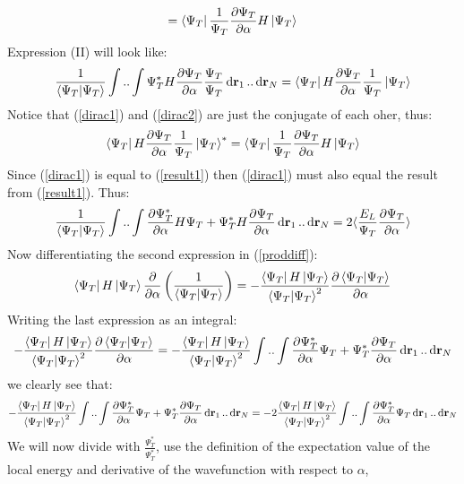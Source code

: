 \documentclass[a4paper, 10pt]{article}
\begin{document}
\begin{appendices}
\begin{align}
= \bra{\Psi_{T}}\frac{1}{\Psi_{T}}\pdv{\Psi_{T}}{\alpha}H\ket{\Psi_{T}}
\label{dirac1}
\end{align}
Expression (II) will look like:
\begin{align}
\frac{1}{\braket{\Psi_{T}}}\int..\int\Psi_{T}^{*}H\pdv{\Psi_{T}}{\alpha}\frac{\Psi_{T}}{\Psi_{T}}\dd{\bold{r}_{1}}..\dd{\bold{r}_{N}}
= \bra{\Psi_{T}}H\pdv{\Psi_{T}}{\alpha}\frac{1}{\Psi_{T}}\ket{\Psi_{T}}
\label{dirac2}
\end{align}
Notice that (\ref{dirac1}) and (\ref{dirac2}) are just the conjugate of each oher, thus:
\begin{align}
\bra{\Psi_{T}}H\pdv{\Psi_{T}}{\alpha}\frac{1}{\Psi_{T}}\ket{\Psi_{T}}^{*}
=
\bra{\Psi_{T}}\frac{1}{\Psi_{T}}\pdv{\Psi_{T}}{\alpha}H\ket{\Psi_{T}}
\end{align}
Since (\ref{dirac1}) is equal to (\ref{result1}) then (\ref{dirac1}) must also equal the result from
(\ref{result1}). Thus:
\begin{align}
\frac{1}{\braket{\Psi_{T}}}\int..\int\pdv{\Psi_{T}^{*}}{\alpha}H\Psi_{T}
+   \Psi_{T}^{*}H\pdv{\Psi_{T}}{\alpha}\dd{\bold{r}_{1}}..\dd{\bold{r}_{N}}
= 2 \langle \frac{E_{L}}{\Psi_{T}}\pdv{\Psi_{T}}{\alpha} \rangle
\end{align}
Now differentiating the second expression in (\ref{proddiff}):
\begin{align}
\bra{\Psi_{T}}H\ket{\Psi_{T}}\pdv{\alpha}\left(\frac{1}{\braket{\Psi_{T}}}\right)
= -\frac{\bra{\Psi_{T}}H\ket{\Psi_{T}}}{\braket{\Psi_{T}}^{2}}\pdv{\braket{\Psi_{T}}}{\alpha}
\end{align}
Writing the last expression as an integral:
\begin{align}
-\frac{\bra{\Psi_{T}}H\ket{\Psi_{T}}}{\braket{\Psi_{T}}^{2}}\pdv{\braket{\Psi_{T}}}{\alpha}
= -\frac{\bra{\Psi_{T}}H\ket{\Psi_{T}}}{\braket{\Psi_{T}}^{2}}\int..\int \pdv{\Psi_{T}^{*}}{\alpha}\Psi_{T} +
\Psi_{T}^{*}\pdv{\Psi_{T}}{\alpha}\dd{\bold{r}_{1}}..\dd{\bold{r}_{N}}
\end{align}
we clearly see that:
\begin{align}
-\frac{\bra{\Psi_{T}}H\ket{\Psi_{T}}}{\braket{\Psi_{T}}^{2}}\int..\int \pdv{\Psi_{T}^{*}}{\alpha}\Psi_{T}
+
\Psi_{T}^{*}\pdv{\Psi_{T}}{\alpha}\dd{\bold{r}_{1}}..\dd{\bold{r}_{N}}
=
-2\frac{\bra{\Psi_{T}}H\ket{\Psi_{T}}}{\braket{\Psi_{T}}^{2}}\int..\int \pdv{\Psi_{T}^{*}}{\alpha}\Psi_{T}\dd{\bold{r}_{1}}..\dd{\bold{r}_{N}}
\end{align}
We will now divide with $\frac{\Psi_{T}^{*}}{\Psi_{T}^{*}}$,
use the definition of the expectation value of the local energy and derivative of the wavefunction with respect to $\alpha$,

\end{appendices}
\end{document}
